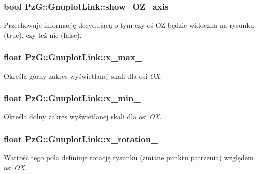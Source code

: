\subsubsection[{\texorpdfstring{show\+\_\+\+O\+Z\+\_\+axis\+\_\+}{show_OZ_axis_}}]{\setlength{\rightskip}{0pt plus 5cm}bool Pz\+G\+::\+Gnuplot\+Link\+::show\+\_\+\+O\+Z\+\_\+axis\+\_\+\hspace{0.3cm}{\ttfamily [protected]}}\hypertarget{class_pz_g_1_1_gnuplot_link_a436e59363f312d5a98548526ced023ca}{}\label{class_pz_g_1_1_gnuplot_link_a436e59363f312d5a98548526ced023ca}
Przechowuje informację decydującą o tym czy oś OZ będzie widoczna na rysunku ({\ttfamily true}), czy też nie ({\ttfamily false}). 
\subsubsection[{\texorpdfstring{x\+\_\+max\+\_\+}{x_max_}}]{\setlength{\rightskip}{0pt plus 5cm}float Pz\+G\+::\+Gnuplot\+Link\+::x\+\_\+max\+\_\+\hspace{0.3cm}{\ttfamily [protected]}}\hypertarget{class_pz_g_1_1_gnuplot_link_a1f8870f0cc643c5ef931b30b40b5e282}{}\label{class_pz_g_1_1_gnuplot_link_a1f8870f0cc643c5ef931b30b40b5e282}
Określa górny zakres wyświetlanej skali dla osi {\itshape OX}. 
\subsubsection[{\texorpdfstring{x\+\_\+min\+\_\+}{x_min_}}]{\setlength{\rightskip}{0pt plus 5cm}float Pz\+G\+::\+Gnuplot\+Link\+::x\+\_\+min\+\_\+\hspace{0.3cm}{\ttfamily [protected]}}\hypertarget{class_pz_g_1_1_gnuplot_link_a9ca081e311914fb07ee4c292b8090247}{}\label{class_pz_g_1_1_gnuplot_link_a9ca081e311914fb07ee4c292b8090247}
Określa dolny zakres wyświetlanej skali dla osi {\itshape OX}. 
\subsubsection[{\texorpdfstring{x\+\_\+rotation\+\_\+}{x_rotation_}}]{\setlength{\rightskip}{0pt plus 5cm}float Pz\+G\+::\+Gnuplot\+Link\+::x\+\_\+rotation\+\_\+\hspace{0.3cm}{\ttfamily [protected]}}\hypertarget{class_pz_g_1_1_gnuplot_link_ae105dcd466bbc10f0b70ed753e0c2e4e}{}\label{class_pz_g_1_1_gnuplot_link_ae105dcd466bbc10f0b70ed753e0c2e4e}
Wartość tego pola definiuje rotację rysunku (zmiane punktu patrzenia) względem osi {\itshape OX}. 

